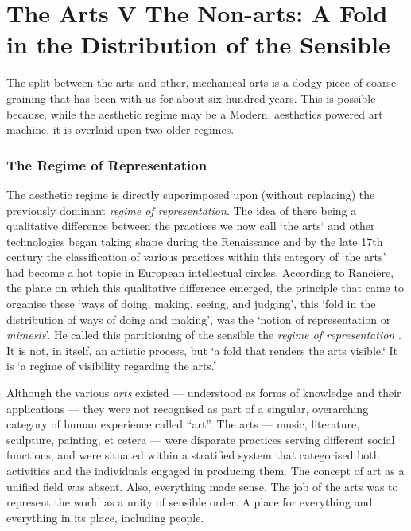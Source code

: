 \documentclass[letterpaper]{article}
\begin{document}
\section{The Arts V The Non-arts: A Fold in the Distribution of the Sensible}
    
    The split between the arts and other, mechanical arts is a dodgy piece of coarse graining that has been with us for about six hundred years. This is possible because, while the aesthetic regime may be a Modern, aesthetics powered art machine, it is overlaid upon two older regimes. 
    
    \subsubsection{The Regime of Representation}

    The aesthetic regime is directly superimposed upon (without replacing) the previously dominant \emph{regime of representation}. The idea of there being a qualitative difference between the practices we now call ‘the arts‘ and other technologies began taking shape during the Renaissance \citep[p.136]{TatarkiewiczWhtIsArt1971} and by the late 17th century the classification of various practices within this category of ‘the arts’ had become a hot topic in European intellectual circles. According to Rancière, the plane on which this qualitative difference emerged, the principle that came to organise these ‘ways of doing, making, seeing, and judging’, this ‘fold in the distribution of ways of doing and making’, was the ‘notion of representation or \emph{mimesis}’. He called this partitioning of the sensible the \emph{regime of representation} \citep[p.22]{RancierPltcsOfThAsthtcs2004}. It is not, in itself, an artistic process, but ‘a fold that renders the arts visible.‘ It is  ‘a regime of visibility regarding the arts.’
    
    Although the various \emph{arts} existed — understood as forms of knowledge and their applications — they were not recognised as part of a singular, overarching category of human experience called “art”. The arts — music, literature, sculpture, painting, et cetera — were disparate practices serving different social functions, and were situated within a stratified system that categorised both activities and the individuals engaged in producing them. The concept of art as a unified field was absent. Also, everything made sense. The job of the arts was to represent the world as a unity of sensible order. A place for everything and everything in its place, including people.
    
\end{document}
